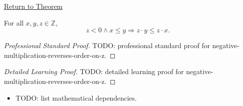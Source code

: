 \newpage
{}
\label{prf:negative-multiplication-reverses-order-on-z}

\begin{remark*}[Return]
\hyperref[cor:negative-multiplication-reverses-order-on-z]{Return to Theorem}
\end{remark*}

\begin{corollary*}
For all $x,y,z\in\mathbb{Z}$,
\[
z<0\land x\le y \Longrightarrow z\cdot y\le z\cdot x.
\]
\end{corollary*}

\begin{proof}[Professional Standard Proof]
\LRAProofBodyStart
TODO: professional standard proof for negative-multiplication-reverses-order-on-z.
\end{proof}

\begin{proof}[Detailed Learning Proof]
\LRAProofBodyStart
TODO: detailed learning proof for negative-multiplication-reverses-order-on-z.
\end{proof}

\begin{remark*}
\end{remark*}

\begin{dependencies}
\begin{itemize}
  \item TODO: list mathematical dependencies.
\end{itemize}
\end{dependencies}

\clearpage
